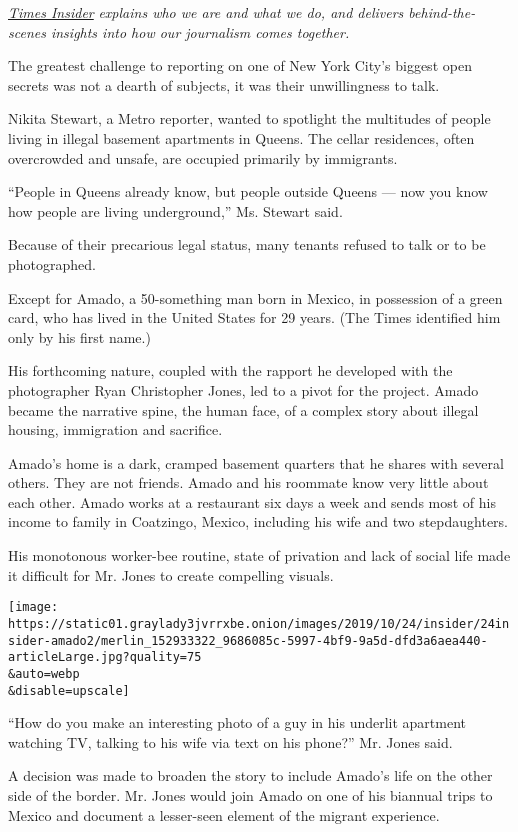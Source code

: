 \href{https://www.nytimes3xbfgragh.onion/series/times-insider}{\emph{Times
Insider}} \emph{explains who we are and what we do, and delivers
behind-the-scenes insights into how our journalism comes together.}

The greatest challenge to reporting on one of New York City's biggest
open secrets was not a dearth of subjects, it was their unwillingness to
talk.

Nikita Stewart, a Metro reporter, wanted to spotlight the multitudes of
people living in illegal basement apartments in Queens. The cellar
residences, often overcrowded and unsafe, are occupied primarily by
immigrants.

``People in Queens already know, but people outside Queens --- now you
know how people are living underground,'' Ms. Stewart said.

Because of their precarious legal status, many tenants refused to talk
or to be photographed.

Except for Amado, a 50-something man born in Mexico, in possession of a
green card, who has lived in the United States for 29 years. (The Times
identified him only by his first name.)

His forthcoming nature, coupled with the rapport he developed with the
photographer Ryan Christopher Jones, led to a pivot for the project.
Amado became the narrative spine, the human face, of a complex story
about illegal housing, immigration and sacrifice.

Amado's home is a dark, cramped basement quarters that he shares with
several others. They are not friends. Amado and his roommate know very
little about each other. Amado works at a restaurant six days a week and
sends most of his income to family in Coatzingo, Mexico, including his
wife and two stepdaughters.

His monotonous worker-bee routine, state of privation and lack of social
life made it difficult for Mr. Jones to create compelling visuals.

\texttt{[image: https://static01.graylady3jvrrxbe.onion/images/2019/10/24/insider/24insider-amado2/merlin\_152933322\_9686085c-5997-4bf9-9a5d-dfd3a6aea440-articleLarge.jpg?quality=75\\\&auto=webp\\\&disable=upscale]}

``How do you make an interesting photo of a guy in his underlit
apartment watching TV, talking to his wife via text on his phone?'' Mr.
Jones said.

A decision was made to broaden the story to include Amado's life on the
other side of the border. Mr. Jones would join Amado on one of his
biannual trips to Mexico and document a lesser-seen element of the
migrant experience.

